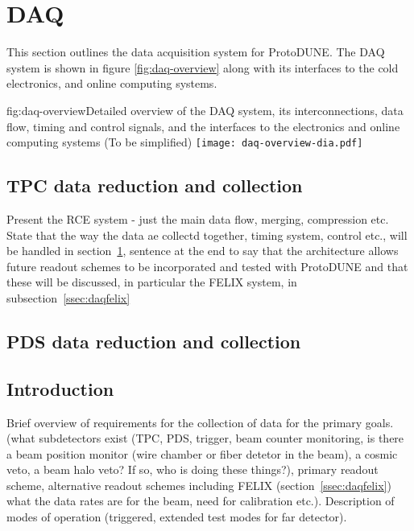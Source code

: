 \section{DAQ}
\label{sec:daq}


This section outlines the data acquisition system for ProtoDUNE.  The DAQ
system is shown in figure \ref{fig:daq-overview} along with its interfaces
to the cold electronics, and online computing systems.


\begin{cdrfigure}{fig:daq-overview}{Detailed overview of the DAQ system, its interconnections, data flow, timing and control signals, and the interfaces to the electronics and online computing systems (To be simplified)}
        \texttt{[image: daq-overview-dia.pdf]}
\end{cdrfigure}

\subsection{TPC data reduction and collection}

Present the RCE system - just the main data flow, merging, compression etc.  State that the way the data ae collectd together, timing system, control etc., will be handled in section~\ref{sec:daq}, sentence at the end to say that the architecture allows future readout schemes to be incorporated and tested with ProtoDUNE and that these will be discussed, in particular the FELIX system, in subsection~\ref{ssec:daqfelix} 

\subsection{PDS data reduction and collection}




\subsection{Introduction}

Brief overview of requirements for the collection of data for the primary goals.  (what subdetectors exist (TPC, PDS, trigger, beam counter monitoring, is there a beam position monitor (wire chamber or fiber detetor in the beam), a cosmic veto, a beam halo veto?  If so, who is doing these things?), primary readout scheme, alternative readout schemes including FELIX (section~\ref{ssec:daqfelix}) what the data rates are for the beam, need for calibration etc.).  Description of modes of operation (triggered, extended test modes for far detector).

